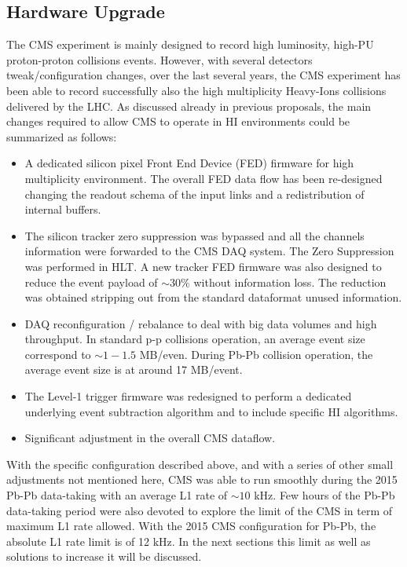 \subsection{Hardware Upgrade\label{subsec:HWintro}}
The CMS experiment is mainly designed to record high luminosity, high-PU proton-proton collisions events.  However, with several detectors tweak/configuration changes, over the last several years, the CMS experiment has been able to record successfully also the high multiplicity Heavy-Ions collisions delivered by the LHC. As discussed already in previous
proposals, the main changes required to allow CMS to operate in HI environments could be summarized as follows:

\begin{itemize}
\item A dedicated silicon pixel Front End Device (FED) firmware for high multiplicity environment. The overall FED data flow has been re-designed changing the readout schema of the input links and a redistribution of internal buffers.
 
\item The silicon tracker zero suppression was bypassed and all the channels information were forwarded to the CMS DAQ system. The Zero Suppression was performed in HLT. A new tracker FED firmware was also designed to reduce the event payload of $\sim 30 \%$ without information loss. The reduction was obtained stripping out from the standard dataformat unused information.  

\item DAQ reconfiguration / rebalance to deal with big data volumes and high throughput. In standard p-p collisions operation, an average event size correspond to $\sim 1-1.5$ MB/even. During Pb-Pb collision operation, the average event size is at around 17 MB/event. 

\item The Level-1 trigger firmware was redesigned to perform a dedicated underlying event subtraction algorithm and to include specific HI algorithms.

\item Significant adjustment in the overall CMS dataflow.
\end{itemize}


With the specific configuration described above, and with a series of other small adjustments not mentioned here, CMS was able to run smoothly during the 2015 Pb-Pb data-taking with an average L1 rate of $\sim 10$ kHz. Few hours of the Pb-Pb data-taking
period were also devoted to explore the limit of the CMS in term of maximum L1 rate allowed.  With the 2015 CMS configuration for Pb-Pb, the absolute L1 rate limit is of 12 kHz. In the next sections this limit as well as solutions to increase it will be discussed. 

